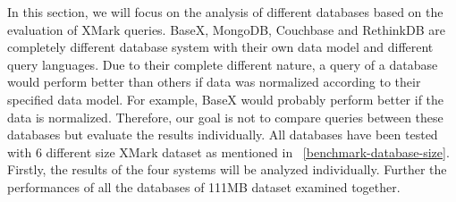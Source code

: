 In this section, we will focus on the analysis of different databases based on the  evaluation of XMark queries. BaseX, MongoDB, Couchbase and RethinkDB are completely different database system  with their own data model and different query languages.  Due to their complete different nature, a query of a database would perform better than others if data was normalized according to their specified data model. For example, BaseX would probably perform better if the data is normalized. Therefore, our goal is not to compare queries between these databases but evaluate the results individually.  All databases have been tested with 6 different size XMark dataset as mentioned in ~\ref{benchmark-database-size}. Firstly, the results  of the four systems will be analyzed individually. Further the performances of all the databases of 111MB dataset examined together.

